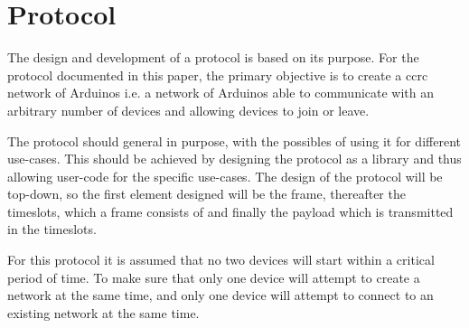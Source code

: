 \section{Protocol}
The design and development of a protocol is based on its purpose.
For the protocol documented in this paper, the primary objective is to create a \acrlong{ccrc} network of Arduinos i.e. a network of Arduinos able to communicate with an arbitrary number of devices and allowing devices to join or leave.

The protocol should general in purpose, with the possibles of using it for different use-cases.
This should be achieved by designing the protocol as a library and thus allowing user-code for the specific use-cases.
The design of the protocol will be top-down, so the first element designed will be the frame, thereafter the timeslots, which a frame consists of and finally the payload which is transmitted in the timeslots. 

For this protocol it is assumed that no two devices will start within a critical period of time.
To make sure that only one device will attempt to create a network at the same time, and only one device will attempt to connect to an existing network at the same time. 
